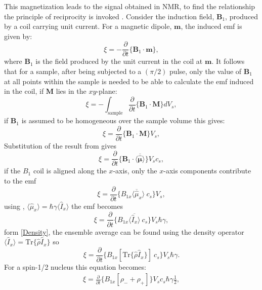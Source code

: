 This magnetization leads to the signal obtained in NMR, to find the relationship the principle of reciprocity
is invoked \citep{Hoult:1976dw}. Consider the induction
field, $\mathbf{B}_1$, produced by a coil carrying unit current. For a magnetic dipole, $\mathbf{m}$,
the induced emf is given by:
\begin{equation}
  \xi = -\frac{\partial}{\partial{t}}\{\mathbf{B}_1\cdot\mathbf{m}\},
\end{equation}
where $\mathbf{B}_1$ is the field produced by the unit current in the coil at $\mathbf{m}$. It follows
that for a sample, after being subjected to a $(\pi/2)$ pulse, only the value of
$\mathbf{B}_1$ at all points within the sample is needed to be able to calculate the emf induced
in the coil, if $\mathbf{M}$ lies in the $xy$-plane:
\begin{equation}
  \xi = -\int_{\text{sample}} \frac{\partial}{\partial{t}}\{\mathbf{B}_1\cdot\mathbf{M}\} dV_s,
\end{equation}
if $\mathbf{B}_1$ is assumed to be homogeneous over the sample volume this gives:
\begin{equation}
  \xi = \frac{\partial}{\partial{t}}\{\mathbf{B}_1\cdot\mathbf{M}\}V_s,
\end{equation}
Substitution of the result from  gives
\begin{equation}
  \xi = \frac{\partial}{\partial{t}}\{\mathbf{B}_1\cdot\langle\overbar{\hat{\pmb{\mu}}}\rangle\}V_sc_s,
\end{equation}
if the $B_1$ coil is aligned along the $x$-axis, only the $x$-axis components contribute to the emf
\begin{equation}
  \xi = \frac{\partial}{\partial{t}}\{B_{1x}\langle\overbar{\hat{\mu}}_x\rangle~c_s\}V_s,
\end{equation}
using , $\langle\hat{\mu}_x\rangle = \hbar\gamma\langle{\hat{I}_x}\rangle$
the emf becomes
\begin{equation}
  \xi = \frac{\partial}{\partial{t}}\{B_{1x}\langle\overbar{\hat{I}_x}\rangle~c_s\}V_s\hbar\gamma,
\end{equation}
form \ref{Density}, the ensemble average can be found using the density operator
$\langle{\hat{I}_x}\rangle = \text{Tr}\{\hat{\rho}\hat{I}_x\}$ so
\begin{equation}
  \xi = \frac{\partial}{\partial{t}}\{B_{1x}[\text{Tr}\{\hat{\rho}\hat{I}_x\}]~c_s\}V_s\hbar\gamma.
\end{equation}
For a spin-1/2 nucleus this equation becomes:
\begin{align}
  \xi = \frac{\partial}{\partial{t}}\{B_{1x}[\rho_- + \rho_+]\}V_sc_s\hbar\gamma\frac{1}{2},
\end{align}
